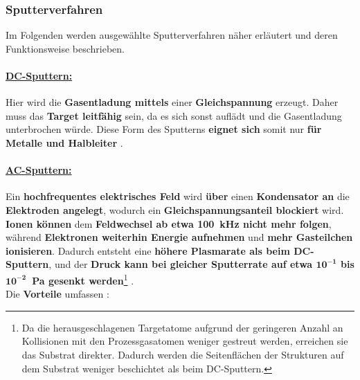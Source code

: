 \documentclass{article} %
\begin{document}


\vspace{1em}

\subsubsection{Sputterverfahren} %

Im Folgenden werden ausgewählte Sputterverfahren näher erläutert und deren Funktionsweise beschrieben.

\vspace{0.0em}

\paragraph{\uline{DC-Sputtern:}} Hier wird die \textbf{Gasentladung mittels} einer \textbf{Gleichspannung} erzeugt. Daher muss das \textbf{Target leitfähig} sein, da es sich sonst auflädt und die Gasentladung unterbrochen würde. Diese Form des Sputterns \textbf{eignet sich} somit nur \textbf{für Metalle und Halbleiter} \cite{keplinger2024}.

\vspace{0.0em}

\paragraph{\uline{AC-Sputtern:}} Ein \textbf{hochfrequentes elektrisches Feld} wird \textbf{über} einen \textbf{Kondensator an} die \textbf{Elektroden angelegt}, wodurch ein \textbf{Gleichspannungsanteil blockiert} wird. \textbf{Ionen können} dem \textbf{Feldwechsel ab etwa 100~kHz nicht mehr folgen}, während \textbf{Elektronen weiterhin Energie aufnehmen} und \textbf{mehr Gasteilchen ionisieren}. Dadurch entsteht eine \textbf{höhere Plasmarate als beim DC-Sputtern}, und der \textbf{Druck kann bei gleicher Sputterrate auf etwa $\mathbf{10^{-1}}$ bis $\mathbf{10^{-2}}$~Pa gesenkt werden}\footnote{Da die herausgeschlagenen Targetatome aufgrund der geringeren Anzahl an Kollisionen mit den Prozessgasatomen weniger gestreut werden, erreichen sie das Substrat direkter. Dadurch werden die Seitenflächen der Strukturen auf dem Substrat weniger beschichtet als beim DC-Sputtern.} \cite{keplinger2024}. \\

Die \textbf{Vorteile} umfassen \cite{keplinger2024}:
\end{document}
